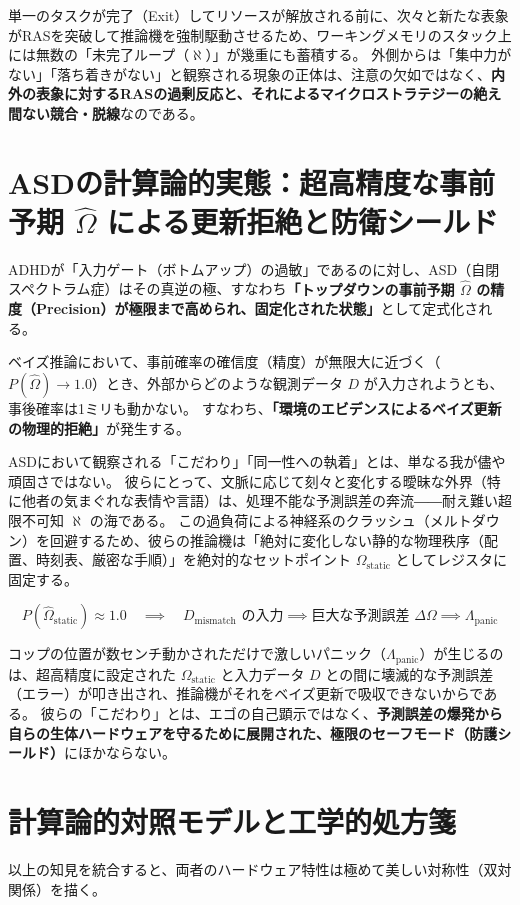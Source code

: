 単一のタスクが完了（Exit）してリソースが解放される前に、次々と新たな表象がRASを突破して推論機を強制駆動させるため、ワーキングメモリのスタック上には無数の「未完了ループ（$\aleph$）」が幾重にも蓄積する。
外側からは「集中力がない」「落ち着きがない」と観察される現象の正体は、注意の欠如ではなく、\textbf{内外の表象に対するRASの過剰反応と、それによるマイクロストラテジーの絶え間ない競合・脱線}なのである。

\section{ASDの計算論的実態：超高精度な事前予期 $\hat{\Omega}$ による更新拒絶と防衛シールド}
ADHDが「入力ゲート（ボトムアップ）の過敏」であるのに対し、ASD（自閉スペクトラム症）はその真逆の極、すなわち\textbf{「トップダウンの事前予期 $\hat{\Omega}$ の精度（Precision）が極限まで高められ、固定化された状態」}として定式化される。

ベイズ推論において、事前確率の確信度（精度）が無限大に近づく（$P(\hat{\Omega}) \to 1.0$）とき、外部からどのような観測データ $D$ が入力されようとも、事後確率は1ミリも動かない。
すなわち、\textbf{「環境のエビデンスによるベイズ更新の物理的拒絶」}が発生する。

ASDにおいて観察される「こだわり」「同一性への執着」とは、単なる我が儘や頑固さではない。
彼らにとって、文脈に応じて刻々と変化する曖昧な外界（特に他者の気まぐれな表情や言語）は、処理不能な予測誤差の奔流――耐え難い超限不可知 $\aleph$ の海である。
この過負荷による神経系のクラッシュ（メルトダウン）を回避するため、彼らの推論機は「絶対に変化しない静的な物理秩序（配置、時刻表、厳密な手順）」を絶対的なセットポイント $\Omega_{\mathrm{static}}$ としてレジスタに固定する。

\begin{equation}
    P(\hat{\Omega}_{\mathrm{static}}) \approx 1.0 \quad \implies \quad D_{\mathrm{mismatch}} \text{ の入力} \implies \text{巨大な予測誤差 } \Delta \Omega \implies \Lambda_{\mathrm{panic}}
\end{equation}

コップの位置が数センチ動かされただけで激しいパニック（$\Lambda_{\mathrm{panic}}$）が生じるのは、超高精度に設定された $\Omega_{\mathrm{static}}$ と入力データ $D$ との間に壊滅的な予測誤差（エラー）が叩き出され、推論機がそれをベイズ更新で吸収できないからである。
彼らの「こだわり」とは、エゴの自己顕示ではなく、\textbf{予測誤差の爆発から自らの生体ハードウェアを守るために展開された、極限のセーフモード（防護シールド）}にほかならない。

\section{計算論的対照モデルと工学的処方箋}
以上の知見を統合すると、両者のハードウェア特性は極めて美しい対称性（双対関係）を描く。


